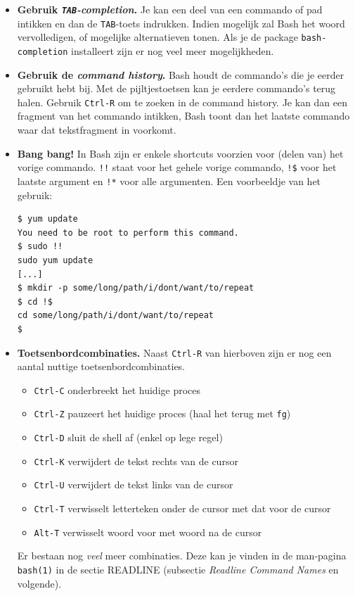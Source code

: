 \begin{itemize}
  \item \textbf{Gebruik \emph{\texttt{TAB}-completion}.} Je kan een deel van een commando of pad intikken en dan de \texttt{TAB}-toets indrukken. Indien mogelijk zal Bash het woord vervolledigen, of mogelijke alternatieven tonen. Als je de package \texttt{bash-completion} installeert zijn er nog veel meer mogelijkheden.
  \item \textbf{Gebruik de \emph{command history}.} Bash houdt de commando's die je eerder gebruikt hebt bij. Met de pijltjestoetsen kan je eerdere commando's terug halen. Gebruik \texttt{Ctrl-R} om te zoeken in de command history. Je kan dan een fragment van het commando intikken, Bash toont dan het laatste commando waar dat tekstfragment in voorkomt.
  \item \textbf{Bang bang!} In Bash zijn er enkele shortcuts voorzien voor (delen van) het vorige commando. \texttt{!!} staat voor het gehele vorige commando, \texttt{!\$} voor het laatste argument en \texttt{!*} voor alle argumenten. Een voorbeeldje van het gebruik:

    \begin{verbatim}
$ yum update
You need to be root to perform this command.
$ sudo !!
sudo yum update
[...]
$ mkdir -p some/long/path/i/dont/want/to/repeat
$ cd !$
cd some/long/path/i/dont/want/to/repeat
$
\end{verbatim}
  \item \textbf{Toetsenbordcombinaties.} Naast \texttt{Ctrl-R} van hierboven zijn er nog een aantal nuttige toetsenbordcombinaties.
    \begin{itemize}
      \item \texttt{Ctrl-C} onderbreekt het huidige proces
      \item \texttt{Ctrl-Z} pauzeert het huidige proces (haal het terug met \texttt{fg})
      \item \texttt{Ctrl-D} sluit de shell af (enkel op lege regel)
      \item \texttt{Ctrl-K} verwijdert de tekst rechts van de cursor
      \item \texttt{Ctrl-U} verwijdert de tekst links van de cursor
      \item \texttt{Ctrl-T} verwisselt letterteken onder de cursor met dat voor de cursor
      \item \texttt{Alt-T} verwisselt woord voor met woord na de cursor
    \end{itemize}

    Er bestaan nog \emph{veel} meer combinaties. Deze kan je vinden in de man-pagina \texttt{bash(1)} in de sectie READLINE (subsectie \emph{Readline Command Names} en volgende).


\end{itemize}
